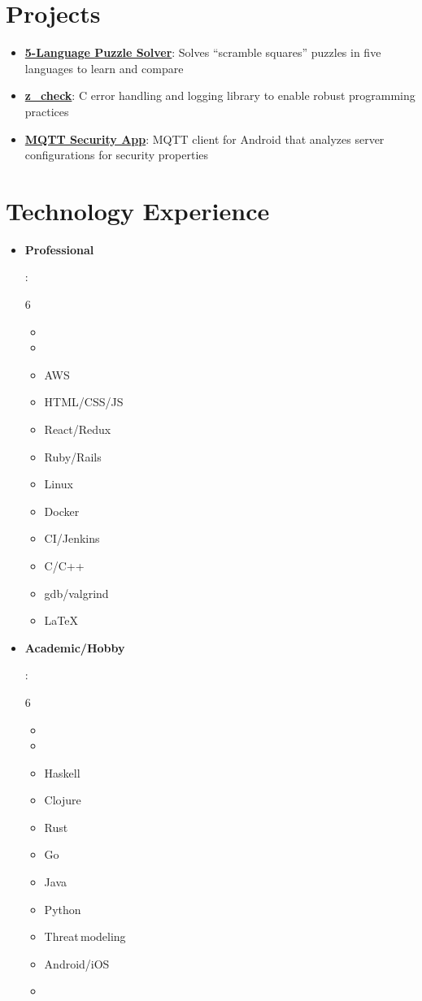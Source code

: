 \documentclass[letterpaper,11pt]{article}
\newcommand{\resumeItem}[2]{
  \item\small{
    \textbf{#1}{: #2 \vspace{-2pt}}
  }
}
\newcommand{\resumeSubItem}[2]{\resumeItem{#1}{#2}\vspace{-4pt}}
\newcommand{\resumeSubHeadingListStart}{\begin{itemize}[leftmargin=*]}
\newcommand{\resumeSubHeadingListEnd}{\end{itemize}}
\newcommand{\resumeListMulticolStart}[1]{
  \vspace{-2.4em}
  \setlength{\columnsep}{-1pc}
  \begin{multicols}{#1}
    \begin{itemize}[label={}]
      \item
}
\newcommand{\resumeListMulticolEnd}{
    \end{itemize}
  \end{multicols}
  \vspace{-10pt}
}
\begin{document}
\section{Projects}
  \resumeSubHeadingListStart
    \resumeSubItem{\href{https://github.com/kkredit/scramble-squares-solvers}{5-Language Puzzle Solver}}
      {Solves ``scramble squares'' puzzles in five languages to learn and compare}
    \resumeSubItem{\href{https://github.com/kkredit/z_check}{z\_check}}
      {C error handling and logging library to enable robust programming practices}
    \resumeSubItem{\href{https://github.com/kkredit/MQTT-sweeper-android}{MQTT Security App}}
      {MQTT client for Android that analyzes server configurations for security properties}
  \resumeSubHeadingListEnd


\section{Technology Experience}
  \resumeSubHeadingListStart

  \resumeSubItem{Professional}
    {
      \resumeListMulticolStart{6}
        \item %
        \item AWS
        \item HTML/CSS/JS
        \item React/Redux
        \item Ruby/Rails
        \item Linux
        \item Docker
        \item CI/Jenkins
        \item C/C++
        \item gdb/valgrind
        \item \LaTeX
      \resumeListMulticolEnd
    }
  \resumeSubItem{Academic/Hobby}
    {
      \resumeListMulticolStart{6}
        \item %
        \item Haskell
        \item Clojure
        \item Rust
        \item Go
        \item Java
        \item Python
        \item Threat\,modeling
        \item Android/iOS
        \item %
      \resumeListMulticolEnd
    }
  \resumeSubHeadingListEnd
\end{document}
